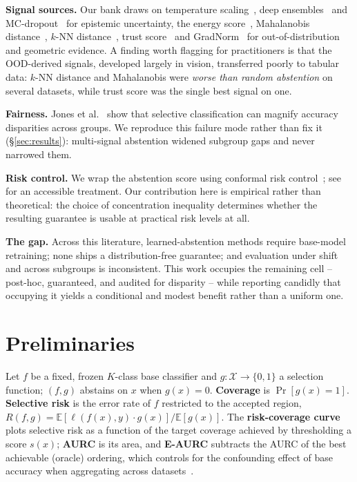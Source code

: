 \documentclass[conference]{IEEEtran}
\begin{document}
\textbf{Signal sources.} Our bank draws on temperature
scaling~\cite{guo2017calibration}, deep
ensembles~\cite{lakshminarayanan2017ensembles} and
MC-dropout~\cite{gal2016dropout} for epistemic uncertainty, the energy
score~\cite{liu2020energy}, Mahalanobis distance~\cite{lee2018mahalanobis},
$k$-NN distance~\cite{sun2022knn}, trust score~\cite{jiang2018trustscore}
and GradNorm~\cite{huang2021gradnorm} for out-of-distribution and
geometric evidence. A finding worth flagging for practitioners is that the
OOD-derived signals, developed largely in vision, transferred poorly to
tabular data: $k$-NN distance and Mahalanobis were \emph{worse than random
abstention} on several datasets, while trust score was the single best
signal on one.

\textbf{Fairness.} Jones et al.~\cite{jones2021disparities} show that
selective classification can magnify accuracy disparities across groups.
We reproduce this failure mode rather than fix it (\S\ref{sec:results}):
multi-signal abstention widened subgroup gaps and never narrowed them.

\textbf{Risk control.} We wrap the abstention score using conformal risk
control~\cite{vovk2005conformal, angelopoulos2022riskcontrol,
angelopoulos2021learnthentest}; see~\cite{angelopoulos2021gentle} for an
accessible treatment. Our contribution here is empirical rather than
theoretical: the choice of concentration inequality determines whether the
resulting guarantee is usable at practical risk levels at all.

\textbf{The gap.} Across this literature, learned-abstention methods
require base-model retraining; none ships a distribution-free guarantee;
and evaluation under shift and across subgroups is inconsistent. This work
occupies the remaining cell -- post-hoc, guaranteed, and audited for
disparity -- while reporting candidly that occupying it yields a
conditional and modest benefit rather than a uniform one.

\section{Preliminaries}
\label{sec:prelim}
Let $f$ be a fixed, frozen $K$-class base classifier and $g: \mathcal{X}
\to \{0,1\}$ a selection function; $(f,g)$ abstains on $x$ when $g(x)=0$.
\textbf{Coverage} is $\Pr[g(x)=1]$. \textbf{Selective risk} is the error
rate of $f$ restricted to the accepted region,
$R(f,g) = \mathbb{E}[\ell(f(x),y) \cdot g(x)] / \mathbb{E}[g(x)]$.
The \textbf{risk-coverage curve} plots selective risk as a function of the
target coverage achieved by thresholding a score $s(x)$; \textbf{AURC} is
its area, and \textbf{E-AURC} subtracts the AURC of the best achievable
(oracle) ordering, which controls for the confounding effect of base
accuracy when aggregating across datasets~\cite{geifman2017selective}.
\end{document}
